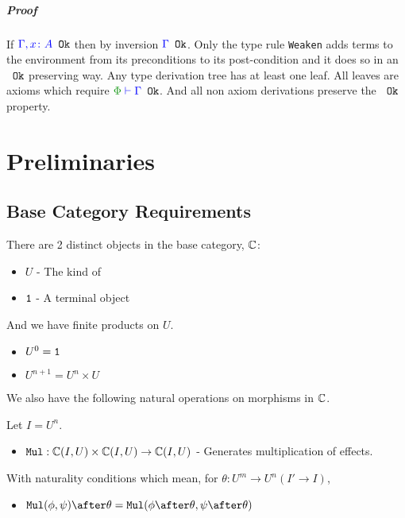 \documentclass{report}
\begin{document}
\paragraph{Proof}
If ${\color{blue} \Gamma, x\colon A} \texttt{ Ok}$ then by inversion ${\color{blue} \Gamma} \texttt{ Ok}$.
Only the type rule \texttt{Weaken} adds terms to the environment from its preconditions to its post-condition and it does so in an ${\color{blue} } \texttt{ Ok}$ preserving way. Any type derivation tree has at least one leaf. All leaves are axioms which require $\oke{\P}{\G}$. And all non axiom derivations preserve the ${\color{blue} } \texttt{ Ok}$ property.



\chapter{Preliminaries}

\section{Base Category Requirements}
There are 2 distinct objects in the base category, $\mathbb{C}$:

\begin{itemize}
    \item $U$ - The kind of \effect
    \item $\texttt{1}$ - A terminal object
\end{itemize}

And we have finite products on $U$.

\begin{itemize}
    \item $U^0 = \texttt{1}$
    \item $U^{n+1} = U^n \times U$
\end{itemize}

We also have the following natural operations on morphisms in $\mathbb{C}$.

Let $I = U^n$.

\begin{itemize}
    \item $\texttt{Mul}:\mathbb{C}(I, U)\times\mathbb{C}(I, U)\rightarrow\mathbb{C}(I, U)$ - Generates multiplication of effects.
\end{itemize}

With naturality conditions which mean, for $\theta: U^m \rightarrow U^n (I' \rightarrow I)$,
\begin{itemize}
    \item $\Mul(\phi,\psi)\after\theta = \Mul(\phi\after\theta,\psi\after\theta)$
\end{itemize}
\end{document}
